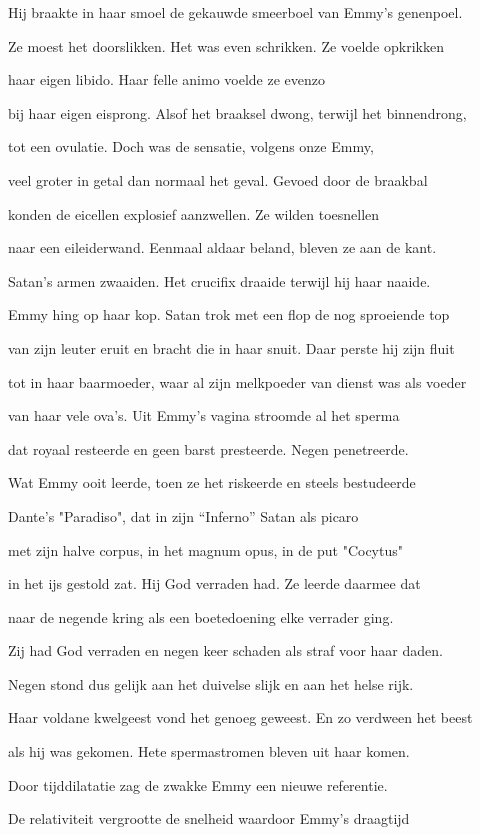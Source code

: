 Hij braakte in haar smoel
de gekauwde smeerboel
van Emmy’s genenpoel.

Ze moest het doorslikken.
Het was even schrikken.
Ze voelde opkrikken

haar eigen libido.
Haar felle animo
voelde ze evenzo

bij haar eigen eisprong.
Alsof het braaksel dwong,
terwijl het binnendrong,

tot een ovulatie.
Doch was de sensatie,
volgens onze Emmy,

veel groter in getal
dan normaal het geval.
Gevoed door de braakbal

konden de eicellen
explosief aanzwellen.
Ze wilden toesnellen

naar een eileiderwand.
Eenmaal aldaar beland,
bleven ze aan de kant.

Satan’s armen zwaaiden.
Het crucifix draaide
terwijl hij haar naaide.

Emmy hing op haar kop.
Satan trok met een flop
de nog sproeiende top

van zijn leuter eruit
en bracht die in haar snuit.
Daar perste hij zijn fluit

tot in haar baarmoeder,
waar al zijn melkpoeder
van dienst was als voeder

van haar vele ova's.
Uit Emmy’s vagina
stroomde al het sperma

dat royaal resteerde
en geen barst presteerde.
Negen penetreerde.

Wat Emmy ooit leerde,
toen ze het riskeerde
en steels bestudeerde

Dante's "Paradiso",
dat in zijn “Inferno”
Satan als picaro

met zijn halve corpus,
in het magnum opus,
in de put "Cocytus"

in het ijs gestold zat.
Hij God verraden had.
Ze leerde daarmee dat

naar de negende kring
als een boetedoening
elke verrader ging.

Zij had God verraden
en negen keer schaden
als straf voor haar daden.

Negen stond dus gelijk
aan het duivelse slijk
en aan het helse rijk.

Haar voldane kwelgeest
vond het genoeg geweest.
En zo verdween het beest

als hij was gekomen.
Hete spermastromen
bleven uit haar komen.

Door tijddilatatie
zag de zwakke Emmy
een nieuwe referentie.

De relativiteit
vergrootte de snelheid
waardoor Emmy’s draagtijd

